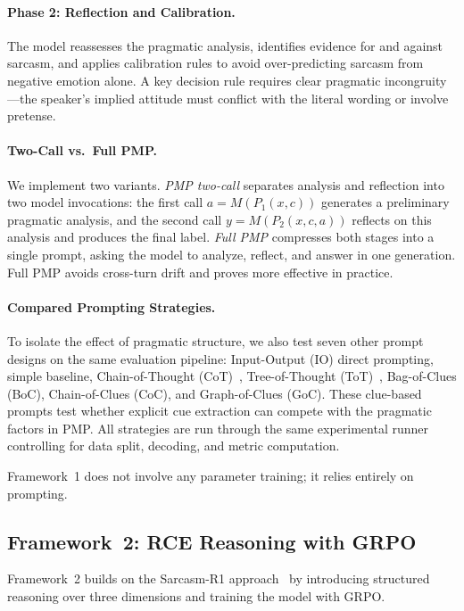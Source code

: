 \documentclass{article}
\begin{document}
\paragraph{Phase 2: Reflection and Calibration.}
The model reassesses the pragmatic analysis, identifies evidence for and against sarcasm, and applies calibration rules to avoid over-predicting sarcasm from negative emotion alone. A key decision rule requires clear pragmatic incongruity---the speaker's implied attitude must conflict with the literal wording or involve pretense.

\paragraph{Two-Call vs.\ Full PMP.}
We implement two variants. \textit{PMP two-call} separates analysis and reflection into two model invocations: the first call $a = M(P_1(x, c))$ generates a preliminary pragmatic analysis, and the second call $y = M(P_2(x, c, a))$ reflects on this analysis and produces the final label. \textit{Full PMP} compresses both stages into a single prompt, asking the model to analyze, reflect, and answer in one generation. Full PMP avoids cross-turn drift and proves more effective in practice.

\paragraph{Compared Prompting Strategies.}
To isolate the effect of pragmatic structure, we also test seven other prompt designs on the same evaluation pipeline: Input-Output (IO) direct prompting, simple baseline, Chain-of-Thought (CoT)~\citep{wei2022chain}, Tree-of-Thought (ToT)~\citep{yao2023tot}, Bag-of-Clues (BoC), Chain-of-Clues (CoC), and Graph-of-Clues (GoC). These clue-based prompts test whether explicit cue extraction can compete with the pragmatic factors in PMP. All strategies are run through the same experimental runner controlling for data split, decoding, and metric computation.

Framework~1 does not involve any parameter training; it relies entirely on prompting.

\subsection{Framework~2: RCE Reasoning with GRPO}

Framework~2 builds on the Sarcasm-R1 approach~\citep{sarcasmr1} by introducing structured reasoning over three dimensions and training the model with GRPO.
\end{document}
